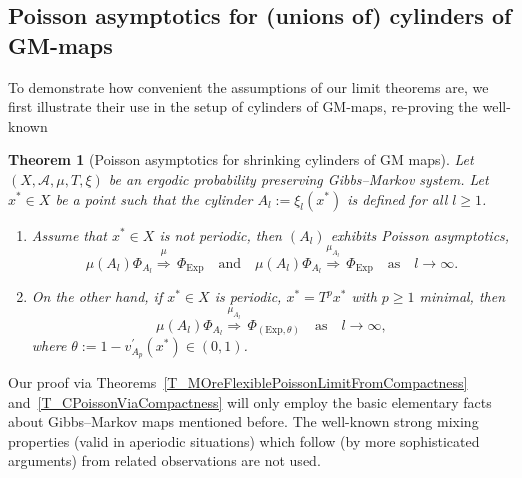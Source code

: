 \documentclass[10pt]{amsart}
\newtheorem{theo}{Theorem}[section]
\theoremstyle{definition}\newtheorem{defi}[theo]{Definition}\newtheorem{rema}[theo]{Remark}\newtheorem{exam}[theo]{Example}\newtheorem{exem}[theo]{Example}\newtheorem{nota}[theo]{Notation}
\newcommand{\clA}{\mathcal{A}}
\newcommand{\Expl}{\mathrm{Exp}}
\newcommand*{\alphenumi}{\renewcommand*{\theenumi}{\alph{enumi}}}
\begin{document}
\subsection{Poisson asymptotics for (unions of) cylinders of GM-maps}
To demonstrate how convenient the assumptions of our limit theorems are, we first illustrate their use in the setup of cylinders of GM-maps, re-proving the well-known

\begin{theo}[{Poisson asymptotics for shrinking cylinders of GM maps}]\label{T_PoissonAsyGMCyls}
Let $(X,\clA,\mu,T,\xi)$ be an ergodic probability preserving Gibbs--Markov system. Let $x^{\ast}\in X$ be a point such that the cylinder $A_{l}:=\xi_{l}(x^{\ast})$ is defined for all $l\geq 1$.
\begin{enumerate}\alphenumi
\item\label{theo10.1.a} Assume that $x^{\ast}\in X$ is not periodic, then $(A_{l})$ exhibits Poisson asymptotics,
\begin{equation}
\mu(A_{l})\Phi_{A_{l}}\overset{\mu}{\Longrightarrow}\,\Phi_{\Expl } \quad \text{and}\quad\mu(A_{l})\Phi_{A_{l}}\overset{\mu_{A_{l}} }{\Longrightarrow}\,\Phi_{\Expl}\quad\text{as}\quad l\rightarrow
\infty.
\end{equation}
\item\label{theo10.1.b} On the other hand, if $x^{\ast}\in X$ is periodic, $x^{\ast} =T^{p}x^{\ast}$ with $p\geq1$ minimal, then
\begin{equation}
\mu(A_{l})\Phi_{A_{l}}\overset{\mu_{A_{l}}}{\Longrightarrow}\,\Phi _{(\Expl,\theta)} \quad\text{as}\quad l\rightarrow\infty,
\end{equation}
where $\theta:=1-v_{A_{p}}^{\prime}(x^{\ast})\in(0,1)$.
\end{enumerate}
\end{theo}




Our proof via Theorems~\ref{T_MOreFlexiblePoissonLimitFromCompactness} and~\ref{T_CPoissonViaCompactness} will only employ the basic elementary facts about Gibbs--Markov maps mentioned before. The well-known strong mixing properties (valid in aperiodic situations) which follow (by more sophisticated arguments) from related observations are not used.
\end{document}
